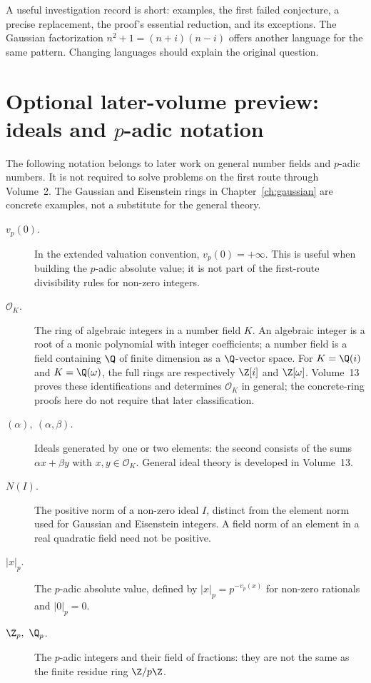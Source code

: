 A useful investigation record is short: examples, the first failed
conjecture, a precise replacement, the proof's essential reduction,
and its exceptions. The Gaussian factorization
$n^2+1=(n+i)(n-i)$ offers another language for the same pattern.
Changing languages should explain the original question.

\section*{Optional later-volume preview: ideals and $p$-adic notation}
The following notation belongs to later work on general number fields and
$p$-adic numbers. It is not required to solve problems on the first route
through Volume~2. The Gaussian and Eisenstein rings in Chapter~\ref{ch:gaussian}
are concrete examples, not a substitute for the general theory.

\begin{description}
\item[$v_p(0)$.] In the extended valuation convention, $v_p(0)=+\infty$. This is useful when building the $p$-adic absolute value; it is not part of the first-route divisibility rules for non-zero integers.
\item[$\mathcal O_K$.] The ring of algebraic integers in a number field $K$. An algebraic integer
is a root of a monic polynomial with integer coefficients; a number field
is a field containing $\Q$ of finite dimension as a $\Q$-vector space.
For $K=\Q(i)$ and $K=\Q(\omega)$, the full rings are respectively
$\Z[i]$ and $\Z[\omega]$. Volume~13 proves these identifications
and determines $\mathcal O_K$ in general; the concrete-ring proofs here
do not require that later classification.
\item[$(\alpha),\ (\alpha,\beta)$.] Ideals generated by one or two elements:
the second consists of the sums $\alpha x+\beta y$ with
$x,y\in\mathcal O_K$. General ideal theory is developed in Volume~13.
\item[$N(I)$.] The positive norm of a non-zero ideal $I$, distinct from
the element norm used for Gaussian and Eisenstein integers. A field norm
of an element in a real quadratic field need not be positive.
\item[$|x|_p$.]\label{sym:padic} The $p$-adic absolute value, defined by $|x|_p=p^{-v_p(x)}$
for non-zero rationals and $|0|_p=0$.
\item[$\Z_p,\ \Q_p$.] The $p$-adic integers and their field of fractions:
they are not the same as the finite residue ring $\Z/p\Z$.
\end{description}


